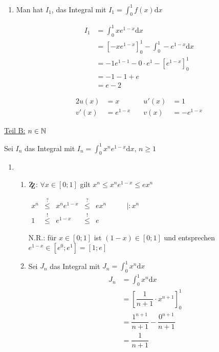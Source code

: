 \documentclass[main.tex]{subfiles}
\begin{document}
\begin{Beweis}
\begin{enumerate}
		\item Man hat $I_1$,  das Integral mit $I_1=\int_0^1f(x)\mbox{d}x$\\
			\begin{minipage}{0.5\textwidth}
				\begin{align*}
					I_1&=\int_0^1xe^{1-x}\text{d}x \\
					&=\left[ -xe^{1-x} \right]_0^1-\int_0^1-e^{1-x}\text{d}x \\
					&=-1e^{1-1}-0\cdot e^1-\left[ e^{1-x} \right]_0^1 \\
					&=-1-1+e \\
					&=e-2
				\end{align*}
			\end{minipage}
			\begin{minipage}{0.5\textwidth}
				\begin{alignat*}{2}
					u(x)&=x \quad& u\prime(x)&=1\\
					v'(x)&=e^{1-x}\quad & v(x)&=-e^{1-x}
				\end{alignat*}
			\end{minipage}
	\end{enumerate}

	\underline{Teil B:} $n\in\mathbb{N}$

	Sei $I_n$ das Integral mit $I_n=\int_0^1x^ne^{1-x}\mbox{d}x$, $n\geq 1$

	\begin{enumerate}
		\item
			\begin{enumerate}
				\item $\zz$: $\forall x\in[0;1]$ gilt $x^n\leq x^ne^{1-x} \leq ex^n$
				
					\begin{center}
						$\begin{array}{cccccc}
							x^n &\stackrel{?}{\leq}& x^ne^{1-x} &\stackrel{?}{\leq}& ex^n&\qquad|:x^n \\
							1        &\stackrel{!}{\leq}&e^{1-x}         &\stackrel{!}{\leq}&e        &
						\end{array}$
					\end{center}
					N.R.: für $x\in[0;1]$ ist $(1-x)\in[0;1]$ und entsprechen $e^{1-x}\in[e^{0};e^{1}]=[1;e]$
				\item Sei $J_n$ das Integral mit $J_n=\int_0^1x^n\mbox{d}x$
					\begin{align*}
						J_n&=\int_0^1x^n\mbox{d}x\\
						&=\left[\dfrac{1}{n+1}\cdot x^{n+1}\right]_0^1\\
						&=\dfrac{1^{n+1}}{n+1}-\dfrac{0^{n+1}}{n+1}\\
						&=\dfrac{1}{n+1}
					\end{align*}


\end{enumerate}
\end{enumerate}
\end{Beweis}
\end{document}
